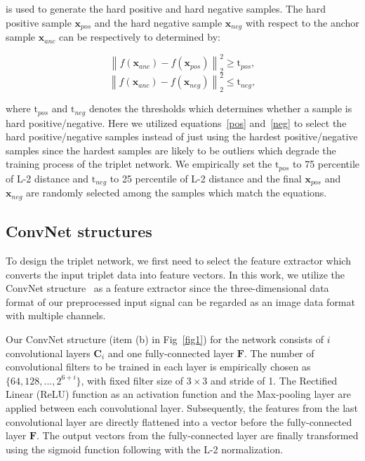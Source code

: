 \documentclass[runningheads]{llncs}
\begin{document}
is used to generate the hard positive and hard negative samples.
The hard positive sample $\mathbf{x}_{pos}$ and the hard negative sample $\mathbf{x}_{neg}$ with respect to the anchor sample $\mathbf{x}_{anc}$ can be respectively to determined by:

\begin{equation}
    {\left\| {{f\left(\mathbf{x}_{anc}\right)} - {f\left(\mathbf{x}_{pos}\right)}} \right\|_2^2} \geq \mathrm{t}_{pos}, \label{pos}
\end{equation}
\begin{equation}
    {\left\| {{f\left(\mathbf{x}_{anc}\right)} - {f\left(\mathbf{x}_{neg}\right)}} \right\|_2^2} \leq \mathrm{t}_{neg},\label{neg}
\end{equation}

where $\mathrm{t}_{pos}$ and $\mathrm{t}_{neg}$ denotes the thresholds which determines whether a sample is hard positive/negative. Here we utilized equations~\eqref{pos} and~\eqref{neg} to select the hard positive/negative samples instead of just using the hardest positive/negative samples since the hardest samples are likely to be outliers which degrade the training process of the triplet network.
We empirically set the $\mathrm{t}_{pos}$ to 75 percentile of L-2 distance and $\mathrm{t}_{neg}$ to 25 percentile of L-2 distance and the final $\mathbf{x}_{pos}$ and $\mathbf{x}_{neg}$ are randomly selected among the samples which match the equations.

\subsection{ConvNet structures}

To design the triplet network, we first need to select the feature extractor which converts the input triplet data into feature vectors. In this work, we utilize the ConvNet structure~\cite{lecun1998gradient} as a feature extractor since the three-dimensional data format of our preprocessed input signal can be regarded as an image data format with multiple channels. 

Our ConvNet structure (item (b) in Fig~\ref{fig1}) for the network consists of $i$ convolutional layers $\mathbf{C}_{i}$ and one fully-connected layer $\mathbf{F}$. The number of convolutional filters to be trained in each layer is empirically chosen as $\{64, 128, ...,  2^{6+i}\}$, with fixed filter size of $3\times3$ and stride of 1. The Rectiﬁed Linear (ReLU) function as an activation function and the Max-pooling layer are applied between each convolutional layer. Subsequently, the features from the last convolutional layer are directly flattened into a vector before the fully-connected layer $\mathbf{F}$.
The output vectors from the fully-connected layer are finally transformed using the sigmoid function following with the L-2 normalization.
\end{document}
